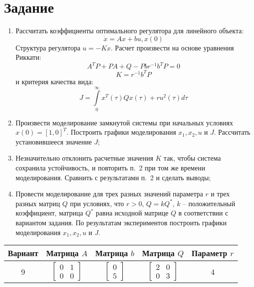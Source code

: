\documentclass[14pt, a4paper]{extarticle}
\begin{document}
	\onehalfspacing
	
	\setcounter{page}{2}
	
	\section*{Задание}
	
	\begin{enumerate}
		\item Рассчитать коэффициенты оптимального регулятора для линейного объекта:
		$$\dot{x}=Ax+bu, x(0)$$
		Структура регулятора $u=-Kx$. Расчет произвести на основе уравнения Риккати:
		$$A^TP+PA+Q-Pbr^{-1}b^TP=0$$
		$$K=r^{-1}b^TP$$
		и критерия качества вида:
		$$J=\int\limits_{0}^{\infty}x^T(\tau)Qx(\tau)+ru^2(\tau)d\tau$$
		\item Произвести моделирование замкнутой системы при начальных условиях $x(0)=[1,0]^T$. Построить графики моделирования $x_1,x_2,u$ и $J$. Рассчитать установившееся значение $J$;
		\item Незначительно отклонить расчетные значения $K$ так, чтобы система сохранила устойчивость, и повторить п.~2 при том же времени моделирования. Сравнить с результатами п.~2 и сделать выводы;
		\item Провести моделирование для трех разных значений параметра $r$ и трех разных матриц $Q$ при условиях, что $r>0$, $Q=kQ^*$, $k$ -- положительный коэффициент, матрица $Q^*$ равна исходной матрице $Q$ в соответствии с вариантом задания. По результатам экспериментов построить графики моделирования $x_1,x_2,u$ и $J$.
	\end{enumerate}
	\begin{table}[H]
		\centering
		\begin{tabular}{|c|c|c|c|c|}
			\hline
			Вариант & Матрица $A$ & Матрица $b$ & Матрица $Q$ & Параметр $r$ \\\hline
			9 & 
			$\left[
			\begin{matrix}
				0 & 1 \\
				0 & 0 
			\end{matrix}
			\right]$
			& 
			$\left[
			\begin{matrix}
				0 \\ 5
			\end{matrix}
			\right]$
			& 
			$\left[
			\begin{matrix}
				2 & 0 \\
				0 & 3 
			\end{matrix}
			\right]$
			& 4 \\\hline
		\end{tabular}
	\end{table}
	
\end{document}
